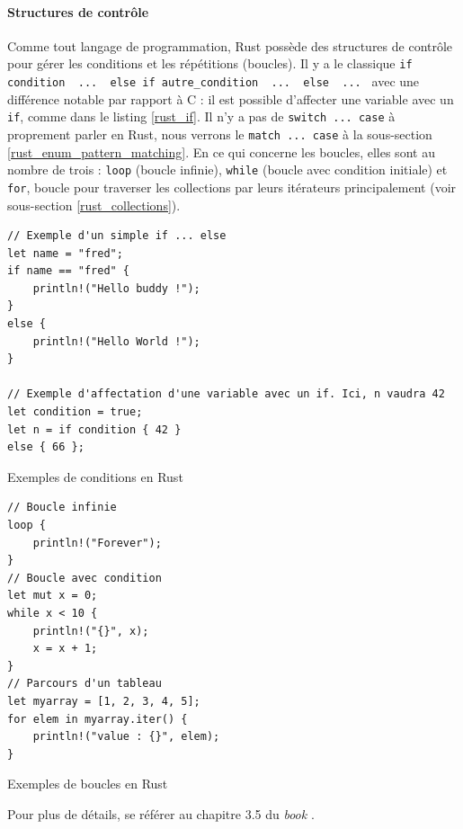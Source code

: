 \paragraph{Structures de contrôle}
Comme tout langage de programmation, Rust possède des structures de contrôle pour gérer les 
conditions et les répétitions (boucles). Il y a le classique \texttt{if condition 
{ ... } else if autre_condition { ... } else { ... }} avec une différence notable par rapport à C : 
il est possible d'affecter une variable avec un \texttt{if}, comme dans le listing 
\ref{rust_if}. Il n'y a pas de \texttt{switch ... case} à proprement parler en Rust, 
nous verrons le \texttt{match ... case} à la sous-section \ref{rust_enum_pattern_matching}.
En ce qui concerne les boucles, elles sont au nombre de trois : \texttt{loop} (boucle 
infinie), \texttt{while} (boucle avec condition initiale) et \texttt{for}, 
boucle pour traverser les collections par leurs itérateurs principalement (voir sous-section 
\ref{rust_collections}).
\bigbreak
\begin{code}
    \begin{verbatim}
// Exemple d'un simple if ... else
let name = "fred";
if name == "fred" {
    println!("Hello buddy !");
}
else {
    println!("Hello World !");
}

// Exemple d'affectation d'une variable avec un if. Ici, n vaudra 42
let condition = true;
let n = if condition { 42 }
else { 66 };
    \end{verbatim}
    \caption{Exemples de conditions en Rust}
    \label{rust_if}
\end{code}
\bigbreak
\begin{code}
    \begin{verbatim}
// Boucle infinie
loop {
    println!("Forever");
}
// Boucle avec condition
let mut x = 0;
while x < 10 {
    println!("{}", x);
    x = x + 1;
}
// Parcours d'un tableau
let myarray = [1, 2, 3, 4, 5];
for elem in myarray.iter() {
    println!("value : {}", elem);
}
    \end{verbatim}
    \caption{Exemples de boucles en Rust}
    \label{rust_loop}
\end{code}
\bigbreak
Pour plus de détails, se référer au chapitre 3.5 du \textit{book} \cite{ref0}.

